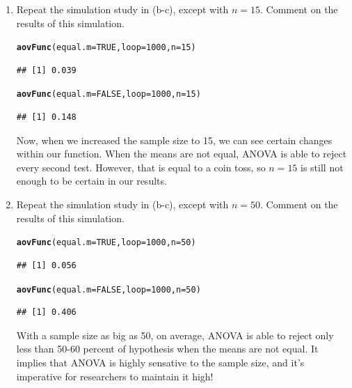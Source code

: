 \documentclass{article}\usepackage[]{graphicx}\usepackage[]{color}
\makeatletter
\newcommand{\hlnum}[1]{\textcolor[rgb]{0.686,0.059,0.569}{#1}}%
\newcommand{\hlstd}[1]{\textcolor[rgb]{0.345,0.345,0.345}{#1}}%
\newcommand{\hlkwc}[1]{\textcolor[rgb]{0.333,0.667,0.333}{#1}}%
\newcommand{\hlkwd}[1]{\textcolor[rgb]{0.737,0.353,0.396}{\textbf{#1}}}%
\newenvironment{kframe}{%
 \def\at@end@of@kframe{}%
 \ifinner\ifhmode%
  \def\at@end@of@kframe{\end{minipage}}%
  \begin{minipage}{\columnwidth}%
 \fi\fi%
 \def\FrameCommand##1{\hskip\@totalleftmargin \hskip-\fboxsep
 \colorbox{shadecolor}{##1}\hskip-\fboxsep
     \hskip-\linewidth \hskip-\@totalleftmargin \hskip\columnwidth}%
 \MakeFramed {\advance\hsize-\width
   \@totalleftmargin\z@ \linewidth\hsize
   \@setminipage}}%
 {\par\unskip\endMakeFramed%
 \at@end@of@kframe}
\newenvironment{knitrout}{}{} %
\makeatother
\begin{document}
\begin{enumerate}
\begin{enumerate}
\item Repeat the simulation study in (b-c), except with $n=15$. Comment on the results of this simulation.
\begin{knitrout}
\color{fgcolor}\begin{kframe}
\begin{alltt}
\hlkwd{aovFunc}\hlstd{(}\hlkwc{equal.m}\hlstd{=}\hlnum{TRUE}\hlstd{,} \hlkwc{loop}\hlstd{=}\hlnum{1000}\hlstd{,} \hlkwc{n}\hlstd{=}\hlnum{15}\hlstd{)}
\end{alltt}
\begin{verbatim}
## [1] 0.039
\end{verbatim}
\begin{alltt}
\hlkwd{aovFunc}\hlstd{(}\hlkwc{equal.m}\hlstd{=}\hlnum{FALSE}\hlstd{,} \hlkwc{loop}\hlstd{=}\hlnum{1000}\hlstd{,} \hlkwc{n}\hlstd{=}\hlnum{15}\hlstd{)}
\end{alltt}
\begin{verbatim}
## [1] 0.148
\end{verbatim}
\end{kframe}
\end{knitrout}
Now, when we increased the sample size to 15, we can see certain changes within our function. When the means are not equal, ANOVA is able to reject every second test. However, that is equal to a coin toss, so $n=15$ is still not enough to be certain in our results.

  \item Repeat the simulation study in (b-c), except with $n=50$.
  Comment on the results of this simulation.
\begin{knitrout}
\color{fgcolor}\begin{kframe}
\begin{alltt}
\hlkwd{aovFunc}\hlstd{(}\hlkwc{equal.m}\hlstd{=}\hlnum{TRUE}\hlstd{,} \hlkwc{loop}\hlstd{=}\hlnum{1000}\hlstd{,} \hlkwc{n}\hlstd{=}\hlnum{50}\hlstd{)}
\end{alltt}
\begin{verbatim}
## [1] 0.056
\end{verbatim}
\begin{alltt}
\hlkwd{aovFunc}\hlstd{(}\hlkwc{equal.m}\hlstd{=}\hlnum{FALSE}\hlstd{,} \hlkwc{loop}\hlstd{=}\hlnum{1000}\hlstd{,} \hlkwc{n}\hlstd{=}\hlnum{50}\hlstd{)}
\end{alltt}
\begin{verbatim}
## [1] 0.406
\end{verbatim}
\end{kframe}
\end{knitrout}
With a sample size as big as 50, on average, ANOVA is able to reject only less than 50-60 percent of hypothesis when the means are not equal. It implies that ANOVA is highly sensative to the sample size, and it's imperative for researchers to maintain it high! 


\end{enumerate}
\end{enumerate}
\end{document}
